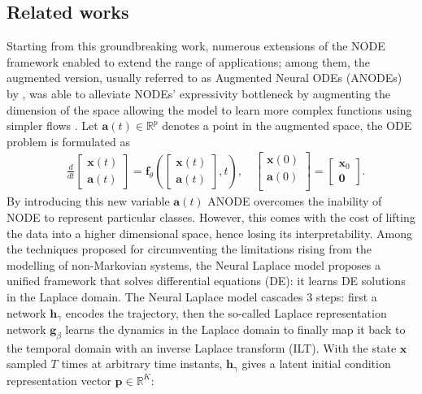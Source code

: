 \subsection{Related works} Starting from this groundbreaking work, numerous extensions of the NODE framework enabled to extend the range of applications; among them, the augmented version, usually referred to as Augmented Neural ODEs (ANODEs) by \cite{dupont2019augmented}, was able to alleviate NODEs' expressivity bottleneck by augmenting the dimension of the space allowing the model to learn more complex functions using simpler flows \citep{dupont2019augmented}. Let $\mathbf{a}(t) \in \mathbb{R}^p$ denotes a point in the augmented space, the ODE problem is formulated as 
%
\begin{equation}
\begin{aligned}
&\frac{d}{dt}
\begin{bmatrix} 
	\mathbf{x}(t)\\
	\mathbf{a}(t)
\end{bmatrix} = \mathbf{f}_{\theta} 
\left( 
\begin{bmatrix} 
	\mathbf{x}(t)\\
	\mathbf{a}(t)
\end{bmatrix}
, t \right), \quad 
\begin{bmatrix} 
	\mathbf{x}(0)\\
	\mathbf{a}(0)\\
\end{bmatrix} = 
\begin{bmatrix} 
	\mathbf{x}_0\\
	\mathbf{0}
\end{bmatrix}.
\end{aligned}
\end{equation} 
%
By introducing this new variable $\mathbf{a}(t)$ ANODE overcomes the inability of NODE to represent particular classes. However, this comes with the cost of lifting the data into a higher dimensional space, hence losing its interpretability. Among the techniques proposed for circumventing the limitations rising from the modelling of non-Markovian systems, the Neural Laplace model \citep{neural_laplace} proposes a unified framework that solves differential equations (DE): it learns DE solutions in the Laplace domain. The Neural Laplace model cascades 3 steps: first a network $\mathbf{h}_{\gamma}$ encodes the trajectory, then the so-called Laplace representation network $\mathbf{g}_{\beta}$ learns the dynamics in the Laplace domain to finally map it back to the temporal domain with an inverse Laplace transform (ILT). With the state $\mathbf{x}$ sampled $T$ times at arbitrary time instants, $\mathbf{h}_{\gamma}$ gives a latent initial condition representation vector $\mathbf{p} \in \mathbb{R}^K$:
